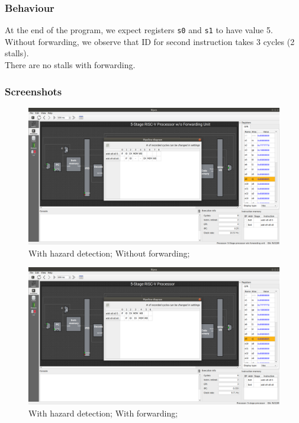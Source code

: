 \documentclass[12pt, fleqn]{article}
\begin{document}
\subsubsection*{Behaviour}
At the end of the program, we expect registers \verb!s0! and \verb!s1! to have value 5. \\
Without forwarding, we observe that ID for second instruction takes 3 cycles (2 stalls). \\
There are no stalls with forwarding.

\subsubsection*{Screenshots}
\begin{figure}[H]
  \centering
  \includegraphics[scale=0.25]{Q2/a_hnf_end_pipeline.png}
  \caption{With hazard detection; Without forwarding;}
\end{figure}
\begin{figure}[H]
  \centering
  \includegraphics[scale=0.25]{Q2/a_hf_end_pipeline.png}
  \caption{With hazard detection; With forwarding;}
\end{figure}
\end{document}
